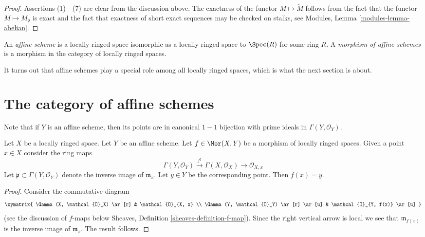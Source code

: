\begin{proof}
Assertions (1) - (7) are clear from the discussion above.
The exactness of the functor $M \mapsto \widetilde M$
follows from the fact that the functor $M \mapsto M_{\mathfrak p}$
is exact and the fact that exactness of short exact sequences
may be checked on stalks, see
Modules, Lemma \ref{modules-lemma-abelian}.
\end{proof}

\begin{definition}
\label{definition-affine-scheme}
An {\it affine scheme} is a locally ringed space isomorphic
as a locally ringed space to $\Spec(R)$ for some ring $R$.
A {\it morphism of affine schemes} is a morphism in the category
of locally ringed spaces.
\end{definition}

\noindent
It turns out that affine schemes play a special role
among all locally ringed spaces, which is what the next
section is about.


















\section{The category of affine schemes}
\label{section-category-affine-schemes}

\noindent
Note that if $Y$ is an affine scheme, then its
points are in canonical $1-1$ bijection with
prime ideals in $\Gamma(Y, \mathcal{O}_Y)$.

\begin{lemma}
\label{lemma-morphism-into-affine-where-point-goes}
Let $X$ be a locally ringed space.
Let $Y$ be an affine scheme.
Let $f \in \Mor(X, Y)$ be a morphism
of locally ringed spaces. Given a point $x \in X$
consider the ring maps
$$
\Gamma(Y, \mathcal{O}_Y) \xrightarrow{f^\sharp}
\Gamma(X, \mathcal{O}_X) \to \mathcal{O}_{X, x}
$$
Let $\mathfrak p \subset \Gamma(Y, \mathcal{O}_Y)$ denote
the inverse image of $\mathfrak m_x$. Let $y \in Y$ be the
corresponding point. Then $f(x) = y$.
\end{lemma}

\begin{proof}
Consider the commutative diagram
$$
\xymatrix{
\Gamma(X, \mathcal{O}_X) \ar[r] &
\mathcal{O}_{X, x} \\
\Gamma(Y, \mathcal{O}_Y) \ar[r] \ar[u] &
\mathcal{O}_{Y, f(x)} \ar[u]
}
$$
(see the discussion of $f$-maps below
Sheaves, Definition \ref{sheaves-definition-f-map}).
Since the right vertical arrow is local
we see that $\mathfrak m_{f(x)}$ is the
inverse image of $\mathfrak m_x$. The result
follows.
\end{proof}

